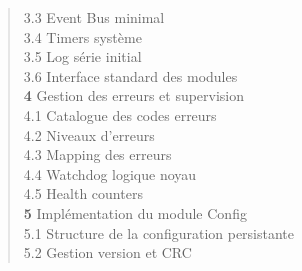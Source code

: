 \begin{quote}
\hspace{2.5em} 3.3 \hspace{0.5em} Event Bus minimal \dotfill \pageref{subsec:evtbus_impl}\\
\hspace{2.5em} 3.4 \hspace{0.5em} Timers système \dotfill \pageref{subsec:timers_impl}\\
\hspace{2.5em} 3.5 \hspace{0.5em} Log série initial \dotfill \pageref{subsec:logserial}\\
\hspace{2.5em} 3.6 \hspace{0.5em} Interface standard des modules \dotfill \pageref{subsec:modiface_impl}\\
\textbf{4} \hspace{1em} Gestion des erreurs et supervision \dotfill \pageref{sec:errors}\\
\hspace{2.5em} 4.1 \hspace{0.5em} Catalogue des codes erreurs \dotfill \pageref{subsec:errcodes}\\
\hspace{2.5em} 4.2 \hspace{0.5em} Niveaux d'erreurs \dotfill \pageref{subsec:errlevels}\\
\hspace{2.5em} 4.3 \hspace{0.5em} Mapping des erreurs \dotfill \pageref{subsec:errmapping}\\
\hspace{2.5em} 4.4 \hspace{0.5em} Watchdog logique noyau \dotfill \pageref{subsec:wdt_impl}\\
\hspace{2.5em} 4.5 \hspace{0.5em} Health counters \dotfill \pageref{subsec:health_impl}\\
\textbf{5} \hspace{1em} Implémentation du module Config \dotfill \pageref{sec:config_impl}\\
\hspace{2.5em} 5.1 \hspace{0.5em} Structure de la configuration persistante \dotfill \pageref{subsec:config_struct}\\
\hspace{2.5em} 5.2 \hspace{0.5em} Gestion version et CRC \dotfill \pageref{subsec:config_crc}\\

\end{quote}
